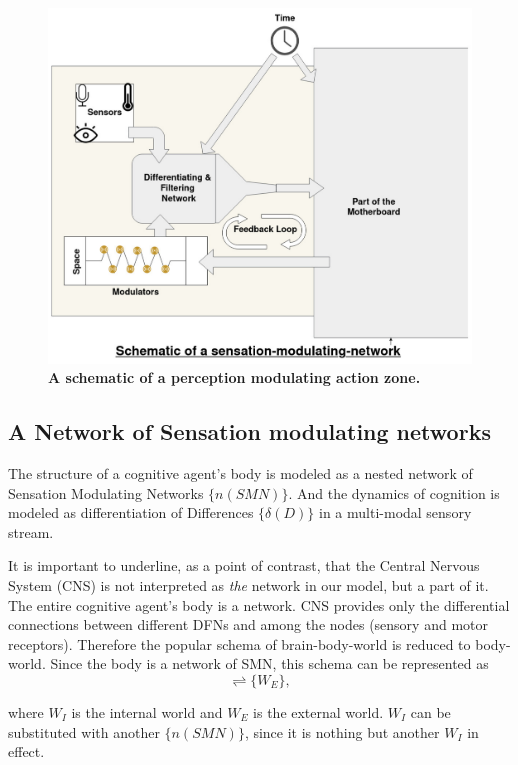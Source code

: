 \begin{figure}[ht] 
\includegraphics[width=\textwidth]{graphics/structure-of-Zone.pdf}
\caption{\textbf{A schematic of a perception modulating action zone.}}
\label{zone}
\end{figure}

\subsection{A Network of Sensation modulating networks}

The structure of a cognitive agent's body is modeled as a nested network of Sensation Modulating Networks $\{n(SMN)\}$. And the dynamics of cognition is modeled as differentiation of Differences $\{\delta(D)\}$ in a  multi-modal sensory stream.

It is important to underline, as a point of contrast, that the Central Nervous System (CNS) is not interpreted as \textit{the} network in our model, but a part of it. The entire cognitive agent's body is a network. CNS provides only the differential connections between different DFNs and among the nodes (sensory and motor receptors). Therefore the popular schema of brain-body-world is reduced to body-world. Since the body is a network of SMN, this schema can be represented as 
\begin{equation}
[\{n(SMN)\} \rightleftharpoons \{W_I\}] \rightleftharpoons \{W_E\},
\end{equation}

where $W_I$ is the internal world and $W_E$ is the external world.  $W_I$ can be substituted with another $\{n(SMN)\}$, since it is nothing but another $W_I$ in effect. 

